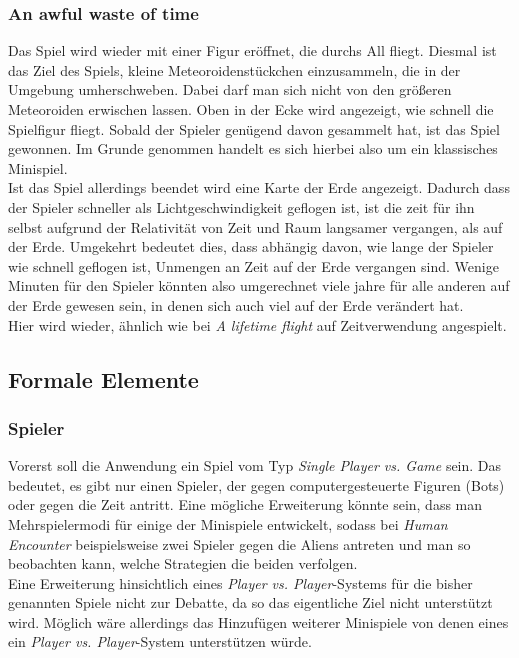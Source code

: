 \documentclass{Ausarbeitung}
\begin{document}
		\subsubsection{An awful waste of time}
			Das Spiel wird wieder mit einer Figur eröffnet, die durchs All fliegt. Diesmal ist das Ziel des Spiels, kleine Meteoroidenstückchen einzusammeln, die in der Umgebung umherschweben. Dabei darf man sich nicht von den größeren Meteoroiden erwischen lassen. Oben in der Ecke wird angezeigt, wie schnell die Spielfigur fliegt. Sobald der Spieler genügend davon gesammelt hat, ist das Spiel gewonnen. Im Grunde genommen handelt es sich hierbei also um ein klassisches Minispiel. \\
			Ist das Spiel allerdings beendet wird eine Karte der Erde angezeigt. Dadurch dass der Spieler schneller als Lichtgeschwindigkeit geflogen ist, ist die zeit für ihn selbst aufgrund der Relativität von Zeit und Raum langsamer vergangen, als auf der Erde. Umgekehrt bedeutet dies, dass abhängig davon, wie lange der Spieler wie schnell geflogen ist, Unmengen an Zeit auf der Erde vergangen sind. Wenige Minuten für den Spieler könnten also umgerechnet viele jahre für alle anderen auf der Erde gewesen sein, in denen sich auch viel auf der Erde verändert hat. \\
			Hier wird wieder, ähnlich wie bei \textit{A lifetime flight} auf Zeitverwendung angespielt.
			
	\subsection{Formale Elemente}
	\label{formElemente}
		\subsubsection{Spieler}
			Vorerst soll die Anwendung ein Spiel vom Typ \textit{Single Player vs. Game} sein. Das bedeutet, es gibt nur einen Spieler, der gegen computergesteuerte Figuren (Bots) oder gegen die Zeit antritt. Eine mögliche Erweiterung könnte sein, dass man Mehrspielermodi für einige der Minispiele entwickelt, sodass bei \textit{Human Encounter} beispielsweise zwei Spieler gegen die Aliens antreten und man so beobachten kann, welche Strategien die beiden verfolgen. \\
			Eine Erweiterung hinsichtlich eines \textit{Player vs. Player}-Systems für die bisher genannten Spiele nicht zur Debatte, da so das eigentliche Ziel nicht unterstützt wird. Möglich wäre allerdings das Hinzufügen weiterer Minispiele von denen eines ein \textit{Player vs. Player}-System unterstützen würde. \\
			
\end{document}
